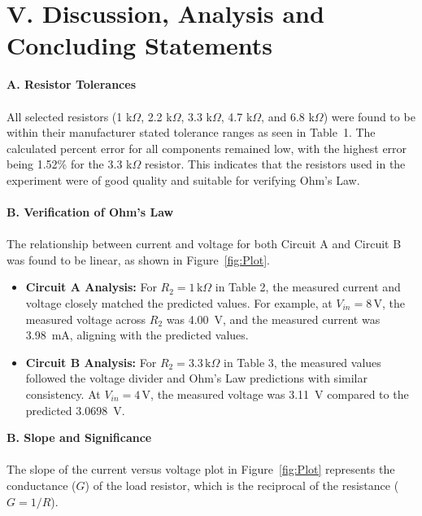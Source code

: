 \documentclass[12pt]{article}
\begin{document}
\section*{V. Discussion, Analysis and Concluding Statements}
\textbf{A. Resistor Tolerances}\\\\
All selected resistors (1 k$\Omega$, 2.2 k$\Omega$, 3.3 k$\Omega$, 4.7 k$\Omega$, and 6.8 k$\Omega$) were found to be within their manufacturer stated tolerance ranges as seen in Table~1. The calculated percent error for all components remained low, with the highest error being 1.52\% for the 3.3 k$\Omega$ resistor. This indicates that the resistors used in the experiment were of good quality and suitable for verifying Ohm's Law.\\\\
\textbf{B. Verification of Ohm's Law}\\\\
The relationship between current and voltage for both Circuit A and Circuit B was found to be linear, as shown in Figure~\ref{fig:Plot}.
\begin{itemize}
    \item \textbf{Circuit A Analysis:} For $R_2 = 1\,\text{k}\Omega$ in Table 2, the measured current and voltage closely matched the predicted values. For example, at $V_{in} = 8\,\text{V}$, the measured voltage across $R_2$ was 4.00~V, and the measured current was 3.98~mA, aligning with the predicted values.
    
    \item \textbf{Circuit B Analysis:} For $R_2 = 3.3\,\text{k}\Omega$ in Table 3, the measured values followed the voltage divider and Ohm's Law predictions with similar consistency. At $V_{in} = 4\,\text{V}$, the measured voltage was 3.11~V compared to the predicted 3.0698~V.
\end{itemize}
\textbf{B. Slope and Significance}\\\\
The slope of the current versus voltage plot in Figure~\ref{fig:Plot} represents the conductance ($G$) of the load resistor, which is the reciprocal of the resistance ($G = 1/R$).
\end{document}

